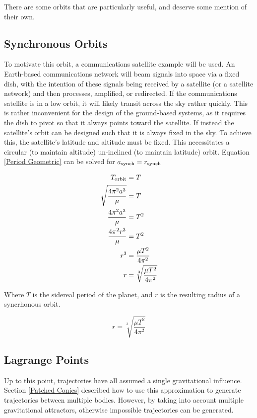 \documentclass[../basicOrbitalDynamics.tex]{subfiles}
\begin{document}
There are some orbits that are particularly useful, and deserve some mention of their own.

\bigskip\bigskip
\subsection{Synchronous Orbits}\label{Synchronous Orbits}

To motivate this orbit, a communications satellite example will be used. An Earth-based communications network will beam signals into space via a fixed dish, with the intention of these signals being received by a satellite (or a satellite network) and then processes, amplified, or redirected. If the communications satellite is in a low orbit, it will likely transit across the sky rather quickly. This is rather inconvenient for the design of the ground-based systems, as it requires the dish to pivot so that it always points toward the satellite. If instead the satellite's orbit can be designed such that it is always fixed in the sky. To achieve this, the satellite's latitude and altitude must be fixed. This necessitates a circular (to maintain altitude) un-inclined (to maintain latitude) orbit. Equation \eqref{Period Geometric} can be solved for ${a}_\text{synch}={r}_\text{synch}$

\begin{align*}
    {T}_\text{orbit}& = T  \\
    \sqrt{\frac{4\pi^2 a^3}{\mu}} & = T  \\
    \frac{4\pi^2 a^3}{\mu} & = T^2\\
    \frac{4\pi^2 r^3}{\mu} & = T^2\\
    r^3& = \frac{\mu T^2}{4\pi^2} \\
    r  & = \sqrt[3]{\frac{\mu T^2}{4\pi^2}} \\
\end{align*}

Where $T$ is the sidereal period of the planet, and $r$ is the resulting radius of a syncrhonous orbit.

\begin{equation}\label{Syncrhonous Orbit}
    r = \sqrt[3]{\frac{\mu T^2}{4\pi^2}}
\end{equation}

\bigskip\bigskip
\subsection{Lagrange Points}\label{Lagrange Points}

Up to this point, trajectories have all assumed a single gravitational influence. Section \ref{Patched Conics} described how to use this approximation to generate trajectories between multiple bodies. However, by taking into account multiple gravitational attractors, otherwise impossible trajectories can be generated.
\end{document}
